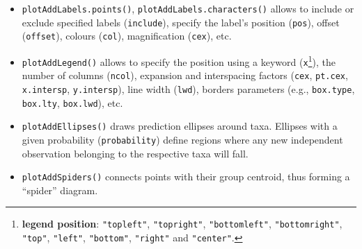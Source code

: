 \documentclass[
  11pt,
  a4paper]{article}
\begin{document}
\begin{itemize}
\item
  \texttt{plotAddLabels.points()}, \texttt{plotAddLabels.characters()}
  allows to include or exclude specified labels (\texttt{include}),
  specify the label's position (\texttt{pos}), offset (\texttt{offset}),
  colours (\texttt{col}), magnification (\texttt{cex}), etc.
  \vspace{-0.1cm}
\item
  \texttt{plotAddLegend()} allows to specify the position using a
  keyword (\texttt{x}\footnote{\textbf{legend position}:
    \texttt{"topleft"}, \texttt{"topright"}, \texttt{"bottomleft"},
    \texttt{"bottomright"}, \texttt{"top"}, \texttt{"left"},
    \texttt{"bottom"}, \texttt{"right"} and \texttt{"center"}.}), the
  number of columns (\texttt{ncol}), expansion and interspacing factors
  (\texttt{cex}, \texttt{pt.cex}, \texttt{x.intersp},
  \texttt{y.intersp}), line width (\texttt{lwd}), borders parameters
  (e.g., \texttt{box.type}, \texttt{box.lty}, \texttt{box.lwd}), etc.
  \vspace{-0.1cm}
\item
  \texttt{plotAddEllipses()} draws prediction ellipses around taxa.
  Ellipses with a given probability (\texttt{probability}) define
  regions where any new independent observation belonging to the
  respective taxa will fall. \vspace{-0.1cm}
\item
  \texttt{plotAddSpiders()} connects points with their group centroid,
  thus forming a ``spider'' diagram. \vspace{-0.1cm}
\end{itemize}
\end{document}
